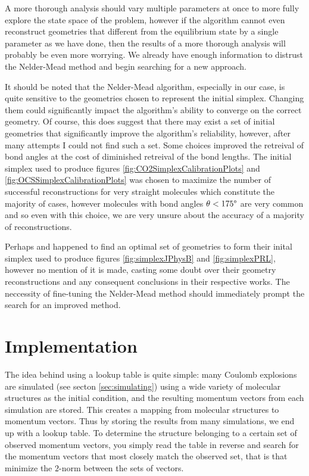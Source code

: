 A more thorough analysis should vary multiple parameters at once to more fully explore the state space of the problem, however if the algorithm cannot even reconstruct geometries that different from the equilibrium state by a single parameter as we have done, then the results of a more thorough analysis will probably be even more worrying. We already have enough information to distrust the Nelder-Mead method and begin searching for a new approach.

It should be noted that the Nelder-Mead algorithm, especially in our case, is quite sensitive to the geometries chosen to represent the initial simplex. Changing them could significantly impact the algorithm's ability to converge on the correct geometry. Of course, this does suggest that there may exist a set of initial geometries that significantly improve the algorithm's reliability, however, after many attempts I could not find such a set. Some choices improved the retreival of bond angles at the cost of diminished retreival of the bond lengths. The initial simplex used to produce figures \ref{fig:CO2SimplexCalibrationPlots} and \ref{fig:OCSSimplexCalibrationPlots} was chosen to maximize the number of successful reconstructions for very straight molecules which constitute the majority of cases, however molecules with bond angles $\theta < 175\degree$ are very common and so even with this choice, we are very unsure about the accuracy of a majority of reconstructions.


Perhaps \citet{Brichta07} and \citet{Bocharova11} happened to find an optimal set of geometries to form their inital simplex used to produce figures \ref{fig:simplexJPhysB} and \ref{fig:simplexPRL}, however no mention of it is made, casting some doubt over their geometry reconstructions and any consequent conclusions in their respective works. The neccessity of fine-tuning the Nelder-Mead method should immediately prompt the search for an improved method.

\section{Implementation}
The idea behind using a lookup table is quite simple: many Coulomb explosions are simulated (see secton \ref{sec:simulating}) using a wide variety of molecular structures as the initial condition, and the resulting momentum vectors from each simulation are stored. This creates a mapping from molecular structures to momentum vectors. Thus by storing the results from many simulations, we end up with a lookup table. To determine the structure belonging to a certain set of observed momentum vectors, you simply read the table in reverse and search for the momentum vectors that most closely match the observed set, that is that minimize the $2$-norm between the sets of vectors.

